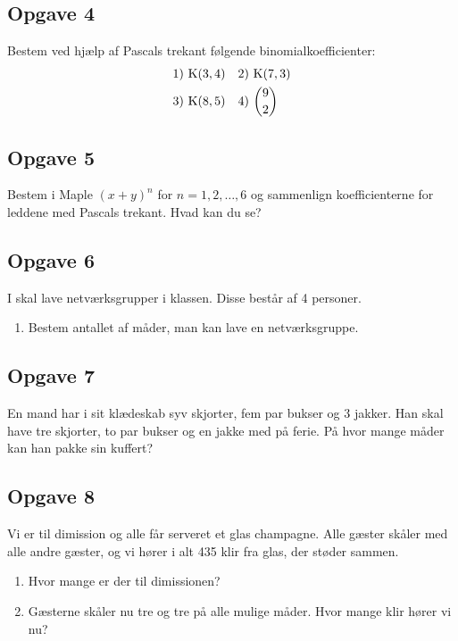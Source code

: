 \subsection*{Opgave 4}
Bestem ved hjælp af Pascals trekant følgende binomialkoefficienter:
\begin{align*}
	&1) \ \textnormal{K}(3,4)  &&2) \ \textnormal{K}(7,3) \\
	&3) \ \textnormal{K}(8,5)  &&4) \ \binom{9}{2} \\
\end{align*}

\subsection*{Opgave 5}
Bestem i Maple $(x + y)^n$ for $n = 1,2,\hdots, 6$ og sammenlign koefficienterne for leddene med Pascals trekant. Hvad kan du se?

\subsection*{Opgave 6}
I skal lave netværksgrupper i klassen. Disse består af 4 personer.
\begin{enumerate}[label=\roman*)]
	\item Bestem antallet af måder, man kan lave en netværksgruppe. 
\end{enumerate}


\subsection*{Opgave 7}
En mand har i sit klædeskab syv skjorter, fem par bukser og 3 jakker. Han skal have tre skjorter, to par bukser og en jakke med på ferie. På hvor mange måder kan han pakke sin kuffert?

\subsection*{Opgave 8}
Vi er til dimission og alle får serveret et glas champagne. Alle gæster skåler med alle andre gæster, og vi hører i alt 435 klir fra glas, der støder sammen.
\begin{enumerate}[label=\roman*)]
	\item Hvor mange er der til dimissionen?
	\item Gæsterne skåler nu tre og tre på alle mulige måder. Hvor mange klir hører vi nu?
\end{enumerate}



